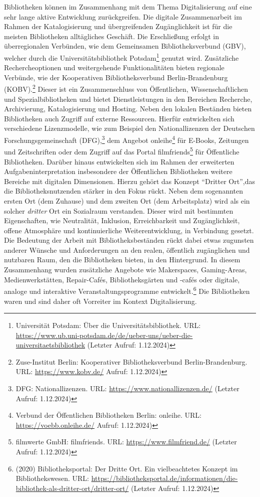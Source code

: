 \documentclass[a4paper,
fontsize=11pt,
oneside,
numbers=noperiodatend,
parskip=half-,
bibliography=totoc,
final
]{scrartcl}
\begin{document}
Bibliotheken können im Zusammenhang mit dem Thema Digitalisierung auf
eine sehr lange aktive Entwicklung zurückgreifen. Die digitale
Zusammenarbeit im Rahmen der Katalogisierung und übergreifenden
Zugänglichkeit ist für die meisten Bibliotheken alltägliches Geschäft.
Die Erschließung erfolgt in überregionalen Verbünden, wie dem
Gemeinsamen Bibliotheksverbund (GBV), welcher durch die
Universitätsbibliothek Potsdam\footnote{Universität Potsdam: Über die
  Universitätsbibliothek. URL:
  \url{https://www.ub.uni-potsdam.de/de/ueber-uns/ueber-die-universitaetsbibliothek}
  (Letzter Aufruf: 1.12.2024)} genutzt wird. Zusätzliche
Rechercheoptionen und weitergehende Funktionalitäten bieten regionale
Verbünde, wie der Kooperativen Bibliotheksverbund Berlin-Brandenburg
(KOBV).\footnote{Zuse-Institut Berlin: Kooperativer Bibliotheksverbund
  Berlin-Brandenburg. URL: \url{https://www.kobv.de/} Aufruf: 1.12.2024)}
Dieser ist ein Zusammenschluss von Öffentlichen, Wissenschaftlichen und
Spezialbibliotheken und bietet Dienstleistungen in den Bereichen
Recherche, Archivierung, Katalogisierung und Hosting. Neben den lokalen
Beständen bieten Bibliotheken auch Zugriff auf externe Ressourcen.
Hierfür entwickelten sich verschiedene Lizenzmodelle, wie zum Beispiel
den Nationallizenzen der Deutschen Forschungsgemeinschaft
(DFG),\footnote{DFG: Nationallizenzen. URL:
  \url{https://www.nationallizenzen.de/} (Letzter Aufruf: 1.12.2024)}
dem Angebot onleihe\footnote{Verbund der Öffentlichen Bibliotheken
  Berlin: onleihe. URL: \url{https://voebb.onleihe.de/} Aufruf:
  1.12.2024)} für E-Books, Zeitungen und Zeitschriften oder dem Zugriff
auf das Portal filmfriends\footnote{filmwerte GmbH: filmfriends. URL:
  \url{https://www.filmfriend.de/} (Letzter Aufruf: 1.12.2024)} für
Öffentliche Bibliotheken. Darüber hinaus entwickelten sich im Rahmen der
erweiterten Aufgabeninterpretation insbesondere der Öffentlichen
Bibliotheken weitere Bereiche mit digitalen Dimensionen. Hierzu gehört
das Konzept \enquote{Dritter Ort},das die Bibliotheksnutzenden stärker
in den Fokus rückt. Neben dem sogenannten ersten Ort (dem Zuhause) und
dem zweiten Ort (dem Arbeitsplatz) wird als ein solcher \emph{dritter}
Ort ein Sozialraum verstanden. Dieser wird mit bestimmten Eigenschaften,
wie Neutralität, Inklusion, Erreichbarkeit und Zugänglichkeit, offene
Atmosphäre und kontinuierliche Weiterentwicklung, in Verbindung gesetzt.
Die Bedeutung der Arbeit mit Bibliotheksbeständen rückt dabei etwas
zugunsten anderer Wünsche und Anforderungen an den realen, öffentlich
zugänglichen und nutzbaren Raum, den die Bibliotheken bieten, in den
Hintergrund. In diesem Zusammenhang wurden zusätzliche Angebote wie
Makerspaces, Gaming-Areas, Medienwerkstätten, Repair-Cafés,
Bibliotheksgärten und -cafés oder digitale, analoge und interaktive
Veranstaltungsprogramme entwickelt.\footnote{(2020) Bibliotheksportal:
  Der Dritte Ort. Ein vielbeachtetes Konzept im Bibliothekswesen. URL:
  \url{https://bibliotheksportal.de/informationen/die-bibliothek-als-dritter-ort/dritter-ort/}
  (Letzter Aufruf: 1.12.2024)} Die Bibliotheken waren und sind daher oft
Vorreiter im Kontext Digitalisierung.
\end{document}
